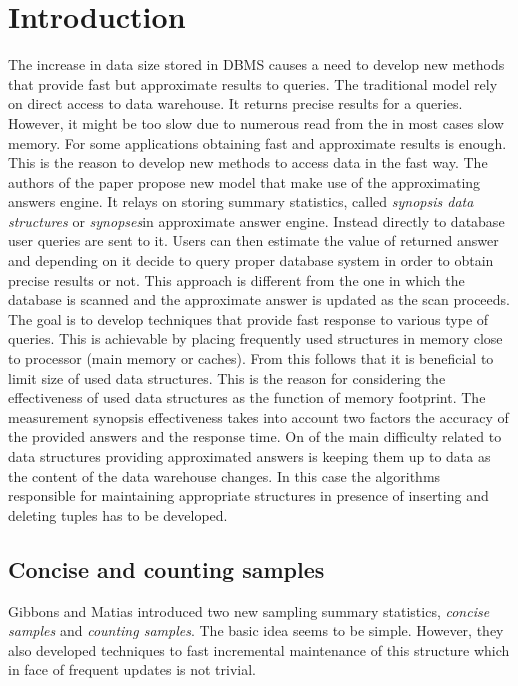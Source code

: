 \section{Introduction}
The increase in data size stored in DBMS causes a need to develop new methods
that provide fast but approximate results to queries. The traditional
model rely on direct access to data warehouse. It returns precise
results for a queries. However, it might be too slow due to numerous
read from the in most cases slow memory. For some applications
obtaining fast and approximate results is enough.
This is the reason to develop new methods to access data in the fast way. The authors
of the paper \cite{GM98} propose new model that make use of the
approximating answers engine. It relays on storing summary statistics,
called \textit{synopsis data structures} or \textit{synopses}in
approximate answer engine. Instead
directly to database user queries are sent to it.
Users can then estimate the value of returned
answer and depending on it decide to query proper database system in
order to obtain precise results or not. This approach
is different from the one in which the database is scanned and the approximate
answer is updated as the scan proceeds.
The goal is to develop techniques that provide fast response to
various type of queries. This is achievable by placing frequently used
structures in memory close to processor (main memory or
caches). From this follows that it is beneficial to limit size of used
data structures. This is the reason for considering the effectiveness
of used data structures as the function of memory footprint. The
measurement synopsis effectiveness takes into account two factors the
accuracy of the provided answers and the response time. On of the main
difficulty related to data structures providing approximated answers is
keeping them up to data as the content of the  data warehouse changes.
In this case the algorithms responsible for maintaining appropriate
structures in presence of inserting and deleting tuples has to be
developed.

\subsection{Concise and counting samples}
Gibbons and Matias \cite{GM98} introduced two new sampling summary
statistics, \textit{concise samples} and \textit{counting
  samples}. The basic idea seems to be simple. However,
they also developed techniques to fast incremental maintenance of this
structure which in face of frequent updates is not trivial.

